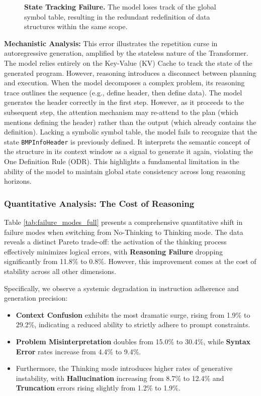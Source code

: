 \documentclass{article}
\theoremstyle{plain}
\theoremstyle{definition}
\theoremstyle{remark}
\begin{document}
\begin{figure}[H]
    \centering
    \caption{\textbf{State Tracking Failure.} The model loses track of the global symbol table, resulting in the redundant redefinition of data structures within the same scope.}
    \label{fig:doubao_error_4}
\end{figure}

\noindent \textbf{Mechanistic Analysis:} This error illustrates the repetition curse in autoregressive generation, amplified by the stateless nature of the Transformer. The model relies entirely on the Key-Value (KV) Cache to track the state of the generated program. However, reasoning introduces a disconnect between planning and execution. When the model decomposes a complex problem, its reasoning trace outlines the sequence (e.g., define header, then define data). The model generates the header correctly in the first step. However, as it proceeds to the subsequent step, the attention mechanism may re-attend to the plan (which mentions defining the header) rather than the output (which already contains the definition). Lacking a symbolic symbol table, the model fails to recognize that the state \texttt{BMPInfoHeader} is previously defined. It interprets the semantic concept of the structure in its context window as a signal to generate it again, violating the One Definition Rule (ODR). This highlights a fundamental limitation in the ability of the model to maintain global state consistency across long reasoning horizons.

\subsubsection{Quantitative Analysis: The Cost of Reasoning}

Table \ref{tab:failure_modes_full} presents a comprehensive quantitative shift in failure modes when switching from No-Thinking to Thinking mode. The data reveals a distinct Pareto trade-off: the activation of the thinking process effectively minimizes logical errors, with \textbf{Reasoning Failure} dropping significantly from 11.8\% to 0.8\%. However, this improvement comes at the cost of stability across all other dimensions.

Specifically, we observe a systemic degradation in instruction adherence and generation precision:
\begin{itemize}
    \item \textbf{Context Confusion} exhibits the most dramatic surge, rising from 1.9\% to 29.2\%, indicating a reduced ability to strictly adhere to prompt constraints.
    \item \textbf{Problem Misinterpretation} doubles from 15.0\% to 30.4\%, while \textbf{Syntax Error} rates increase from 4.4\% to 9.4\%.
    \item Furthermore, the Thinking mode introduces higher rates of generative instability, with \textbf{Hallucination} increasing from 8.7\% to 12.4\% and \textbf{Truncation} errors rising slightly from 1.2\% to 1.9\%.
\end{itemize}
\end{document}
